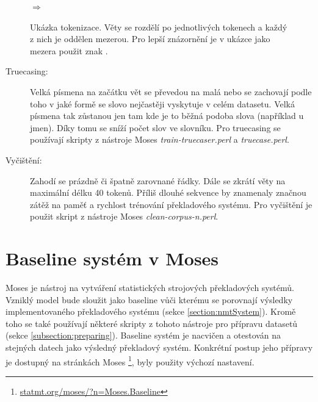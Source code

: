 \begin{figure}[H]
    \begin{center}
     \setlength{\fboxsep}{8pt}
        $\Longrightarrow$
        \setlength{\fboxsep}{8pt}
    \end{center}
	\caption{Ukázka tokenizace. Věty se rozdělí po jednotlivých tokenech a každý z nich je oddělen mezerou. Pro lepší znázornění je v ukázce jako mezera použit znak \uv{\textvisiblespace}.}
	\label{img:tokenization}
\end{figure}


\begin{description}
  \item[Truecasing:] Velká písmena na začátku vět se převedou na malá nebo se zachovají podle toho v jaké formě se slovo nejčastěji vyskytuje v celém datasetu. Velká písmena tak zůstanou jen tam kde je to běžná podoba slova (například u jmen). Díky tomu se sníží počet slov ve slovníku. Pro truecasing se používají skripty z nástroje Moses \emph{train-truecaser.perl} a \emph{truecase.perl}.
\end{description}

\begin{description}
  \item[Vyčištění:] Zahodí se prázdně či špatně zarovnané řádky. Dále se zkrátí věty na maximální délku 40 tokenů. Příliš dlouhé sekvence by znamenaly značnou zátěž na paměť a rychlost trénování překladového systému. Pro vyčištění je použit skript z nástroje Moses \emph{clean-corpus-n.perl}.
\end{description}


\section{Baseline systém v Moses}\label{section:baseline}
Moses \cite{moses} je nástroj na vytváření statistických strojových překladových systémů. Vzniklý model bude sloužit jako baseline vůči kterému se porovnají výsledky implementovaného překladového systému (sekce \ref{section:nmtSystem}). Kromě toho se také používají některé skripty z tohoto nástroje pro přípravu datasetů (sekce \ref{subsection:preparing}). Baseline systém je nacvičen a otestován na stejných datech jako výsledný překladový systém. Konkrétní postup jeho přípravy je dostupný na stránkách Moses \footnote{\url{statmt.org/moses/?n=Moses.Baseline}}, byly použity výchozí nastavení.

